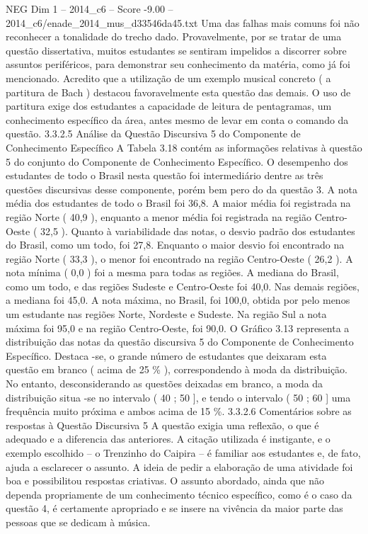 \begin{textsample}{NEG Dim 1 – 2014\_c6 – Score -9.00 – 2014\_c6/enade\_2014\_mus\_d33546da45.txt}
Uma das falhas mais comuns foi não reconhecer a tonalidade do trecho dado.
Provavelmente, por se tratar de uma questão dissertativa, muitos estudantes se sentiram impelidos a discorrer sobre assuntos periféricos, para demonstrar seu conhecimento da matéria, como já foi mencionado.
Acredito que a utilização de um exemplo musical concreto ( a partitura de Bach ) destacou favoravelmente esta questão das demais.
O uso de partitura exige dos estudantes a capacidade de leitura de pentagramas, um conhecimento específico da área, antes mesmo de levar em conta o comando da questão. 3.3.2.5 Análise da Questão Discursiva 5 do Componente de Conhecimento Específico A Tabela 3.18 contém as informações relativas à questão 5 do conjunto do Componente de Conhecimento Específico.
O desempenho dos estudantes de todo o Brasil nesta questão foi intermediário dentre as três questões discursivas desse componente, porém bem pero do da questão 3.
A nota média dos estudantes de todo o Brasil foi 36,8.
A maior média foi registrada na região Norte ( 40,9 ), enquanto a menor média foi registrada na região Centro-Oeste ( 32,5 ).
Quanto à variabilidade das notas, o desvio padrão dos estudantes do Brasil, como um todo, foi 27,8.
Enquanto o maior desvio foi encontrado na região Norte ( 33,3 ), o menor foi encontrado na região Centro-Oeste ( 26,2 ).
A nota mínima ( 0,0 ) foi a mesma para todas as regiões.
A mediana do Brasil, como um todo, e das regiões Sudeste e Centro-Oeste foi 40,0.
Nas demais regiões, a mediana foi 45,0.
A nota máxima, no Brasil, foi 100,0, obtida por pelo menos um estudante nas regiões Norte, Nordeste e Sudeste.
Na região Sul a nota máxima foi 95,0 e na região Centro-Oeste, foi 90,0.
O Gráfico 3.13 representa a distribuição das notas da questão discursiva 5 do Componente de Conhecimento Específico.
Destaca -se, o grande número de estudantes que deixaram esta questão em branco ( acima de 25 \% ), correspondendo à moda da distribuição.
No entanto, desconsiderando as questões deixadas em branco, a moda da distribuição situa -se no intervalo ( 40 ; 50 ], e tendo o intervalo ( 50 ; 60 ] uma frequência muito próxima e ambos acima de 15 \%. 3.3.2.6 Comentários sobre as respostas à Questão Discursiva 5 A questão exigia uma reflexão, o que é adequado e a diferencia das anteriores.
A citação utilizada é instigante, e o exemplo escolhido – o Trenzinho do Caipira – é familiar aos estudantes e, de fato, ajuda a esclarecer o assunto.
A ideia de pedir a elaboração de uma atividade foi boa e possibilitou respostas criativas.
O assunto abordado, ainda que não dependa propriamente de um conhecimento técnico específico, como é o caso da questão 4, é certamente apropriado e se insere na vivência da maior parte das pessoas que se dedicam à música.

\end{textsample}
